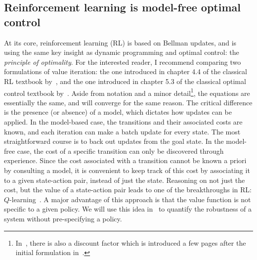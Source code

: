 
\subsection{Reinforcement learning is model-free optimal control}
At its core, reinforcement learning (RL) is based on Bellman updates, and is using the same key insight as dynamic programming and optimal control: the \emph{principle of optimality}.
For the interested reader, I recommend comparing two formulations of value iteration: the one introduced in chapter 4.4 of the classical RL textbook by~\textcite{sutton2018book}, and the one introduced in chapter 5.3 of the classical optimal control textbook by~\textcite{bertsekas2017book}. Aside from notation and a minor detail\footnote{In~\cite{sutton2018book}, there is also a discount factor which is introduced a few pages after the initial formulation in~\cite{bertsekas2017book}.}, the equations are essentially the same, and will converge for the same reason. The critical difference is the presence (or absence) of a model, which dictates how updates can be applied.
In the model-based case, the transitions and their associated costs are known, and each iteration can make a batch update for every state. The most straightforward course is to back out updates from the goal state. In the model-free case, the cost of a specific transition can only be discovered through experience.
Since the cost associated with a transition cannot be known a priori by consulting a model, it is convenient to keep track of this cost by associating it to a given state-action pair, instead of just the state. Reasoning on not just the cost, but the value of a state-action pair leads to one of the breakthroughs in RL: $Q$-learning~\cite[cf. chapter 6.5]{sutton2018book}. A major advantage of this approach is that the value function is not specific to a given policy. We will use this idea in~\cite{heim2019beyond} to quantify the robustness of a system without pre-specifying a policy.


